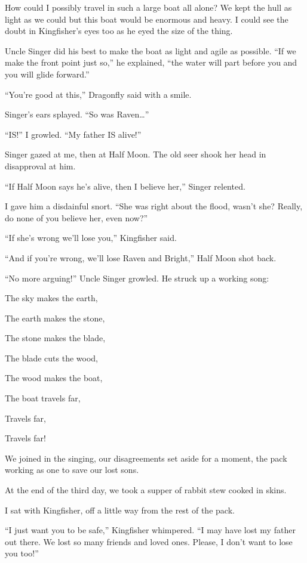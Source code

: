 How could I possibly travel in such a large boat all alone? We kept the hull as light as we could but this boat would be enormous and heavy. I could see the doubt in Kingfisher's eyes too as he eyed the size of the thing.

Uncle Singer did his best to make the boat as light and agile as possible. ``If we make the front point just so,'' he explained, ``the water will part before you and you will glide forward.''

``You're good at this,'' Dragonfly said with a smile.

Singer's ears splayed. ``So was Raven\ldots''

``IS!'' I growled. ``My father IS alive!''

Singer gazed at me, then at Half Moon. The old seer shook her head in disapproval at him.

``If Half Moon says he's alive, then I believe her,'' Singer relented.

I gave him a disdainful snort. ``She was right about the flood, wasn't she? Really, do none of you believe her, even now?''

``If she's wrong we'll lose you,'' Kingfisher said.

``And if you're wrong, we'll lose Raven and Bright,'' Half Moon shot back.

``No more arguing!'' Uncle Singer growled. He struck up a working song:

The sky makes the earth,

The earth makes the stone,

The stone makes the blade,

The blade cuts the wood,

The wood makes the boat,

The boat travels far,

Travels far,

Travels far!

We joined in the singing, our disagreements set aside for a moment, the pack working as one to save our lost sons.

\secdiv

\noindent At the end of the third day, we took a supper of rabbit stew cooked in skins.

I sat with Kingfisher, off a little way from the rest of the pack.

``I just want you to be safe,'' Kingfisher whimpered. ``I may have lost my father out there. We lost so many friends and loved ones. Please, I don't want to lose you too!''

